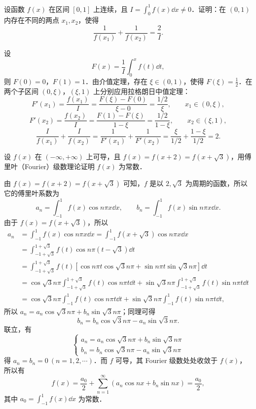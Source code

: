 设函数 $f(x)$ 在区间 $[0,1]$ 上连续，且 $\displaystyle I=\int_0^1 f(x)\dd x\neq 0$．证明：在 $(0,1)$ 内存在不同的两点 $x_1,x_2$，使得
\[
  \frac{1}{f(x_1)}+\frac{1}{f(x_2)}=\frac{2}{I}.
\]
\begin{solution}
  设
  \[
    F(x)=\frac{1}{I}\int_0^x f(t)\dd t,
  \]
  则 $F(0)=0$，$F(1)=1$．由介值定理，存在 $\xi\in(0,1)$，使得 $F(\xi)=\frac{1}{2}$．在两个子区间 $(0,\xi)$，$(\xi,1)$ 上分别应用拉格朗日中值定理：
  \[
    F'(x_1)=\frac{f(x_1)}{I}=\frac{F(\xi)-F(0)}{\xi-0}=\frac{1/2}{\xi},\qquad x_1\in(0,\xi),
  \]
  \[
    F'(x_2)=\frac{f(x_2)}{I}=\frac{F(1)-F(\xi)}{1-\xi}=\frac{1/2}{1-\xi},\qquad x_2\in(\xi,1),
  \]
  \[
    \frac{I}{f(x_1)}+\frac{I}{f(x_2)}=\frac{1}{F'(x_1)}+\frac{1}{F'(x_2)}=\frac{\xi}{1/2}+\frac{1-\xi}{1/2}=2.
  \]
\end{solution}

设 $f(x)$ 在 $(-\infty,+\infty)$ 上可导，且 $f(x)=f(x+2)=f(x+\sqrt{3})$，用傅里叶（Fourier）级数理论证明 $f(x)$ 为常数．
\begin{solution}
  由 $f(x)=f(x+2)=f(x+\sqrt{3})$ 可知，$f$ 是以 $2,\sqrt{3}$ 为周期的函数，所以它的傅里叶系数为
  \[
    a_n=\int_{-1}^{1}f(x)\cos n\pi x\dd x,\qquad b_n=\int_{-1}^{1}f(x)\sin n\pi x\dd x.
  \]
  由于 $f(x)=f(x+\sqrt{3})$，所以
  \begin{align*}
    a_n&=\int_{-1}^{1}f(x)\cos n\pi x\dd x=\int_{-1}^{1}f(x+\sqrt{3})\cos n\pi x\dd x\\
    &=\int_{-1+\sqrt{3}}^{1+\sqrt{3}}f(t)\cos n\pi\left(t-\sqrt{3}\right)\dd t\\
    &=\int_{-1+\sqrt{3}}^{1+\sqrt{3}}f(t)\left[\cos n\pi t\cos\sqrt{3}n\pi+\sin n\pi t\sin\sqrt{3}n\pi\right]\dd t\\
    &=\cos\sqrt{3}n\pi\int_{-1+\sqrt{3}}^{1+\sqrt{3}}f(t)\cos n\pi t\dd t+\sin\sqrt{3}n\pi\int_{-1+\sqrt{3}}^{1+\sqrt{3}}f(t)\sin n\pi t\dd t\\
    &=\cos\sqrt{3}n\pi\int_{-1}^{1}f(t)\cos n\pi t\dd t+\sin\sqrt{3}n\pi\int_{-1}^{1}f(t)\sin n\pi t\dd t,
  \end{align*}
  所以 $a_n=a_n\cos\sqrt{3}n\pi+b_n\sin\sqrt{3}n\pi$；同理可得
  \[
    b_n=b_n\cos\sqrt{3}n\pi-a_n\sin\sqrt{3}n\pi.
  \]
  联立，有
  \[
    \begin{cases}
      a_n=a_n\cos\sqrt{3}n\pi+b_n\sin\sqrt{3}n\pi\\
      b_n=b_n\cos\sqrt{3}n\pi-a_n\sin\sqrt{3}n\pi
    \end{cases}
  \]
  得 $a_n=b_n=0\ (n=1,2,\cdots)$．而 $f$ 可导，其 Fourier 级数处处收敛于 $f(x)$，所以有
  \[
    f(x)=\frac{a_0}{2}+\sum_{n=1}^{\infty}\left(a_n\cos nx+b_n\sin nx\right)=\frac{a_0}{2},
  \]
  其中 $a_0=\int_{-1}^{1}f(x)\dd x$ 为常数．
\end{solution}
